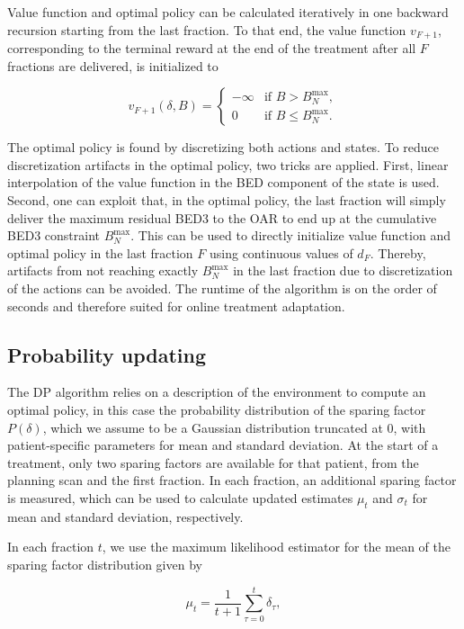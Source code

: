 \documentclass[11pt]{article}
\begin{document}
Value function and optimal policy can be calculated iteratively in one backward recursion starting from the last fraction. To that end, the value function $v_{F+1}$, corresponding to the terminal reward at the end of the treatment after all $F$ fractions are delivered, is initialized to

\[
v_{F+1}(\delta, B) =
\begin{cases}
-\infty & \text{if } B > B_N^{\max}, \\
0 & \text{if } B \leq B_N^{\max}.
\end{cases}
\]

The optimal policy is found by discretizing both actions and states. To reduce discretization artifacts in the optimal policy, two tricks are applied. First, linear interpolation of the value function in the BED component of the state is used. Second, one can exploit that, in the optimal policy, the last fraction will simply deliver the maximum residual BED3 to the OAR to end up at the cumulative BED3 constraint $B_N^{\max}$. This can be used to directly initialize value function and optimal policy in the last fraction $F$ using continuous values of $d_F$. Thereby, artifacts from not reaching exactly $B_N^{\max}$ in the last fraction due to discretization of the actions can be avoided. The runtime of the algorithm is on the order of seconds and therefore suited for online treatment adaptation.

\subsection{Probability updating}

The DP algorithm relies on a description of the environment to compute an optimal policy, in this case the probability distribution of the sparing factor $P(\delta)$, which we assume to be a Gaussian distribution truncated at 0, with patient-specific parameters for mean and standard deviation. At the start of a treatment, only two sparing factors are available for that patient, from the planning scan and the first fraction. In each fraction, an additional sparing factor is measured, which can be used to calculate updated estimates $\mu_t$ and $\sigma_t$ for mean and standard deviation, respectively.

In each fraction $t$, we use the maximum likelihood estimator for the mean of the sparing factor distribution given by

\begin{equation}
\mu_t = \frac{1}{t+1}\sum_{\tau=0}^{t}\delta_{\tau},
\label{eq:mu-update}
\end{equation}
\end{document}

